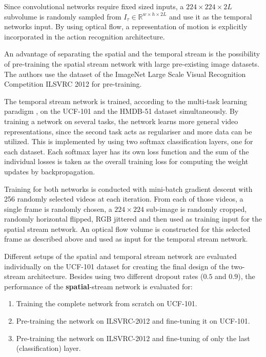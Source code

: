 Since convolutional networks require fixed sized inputs, a $224 \times 224 \times 2L$ subvolume is randomly sampled from $I_\tau \in \mathbb{R}^{w \times h \times 2L}$ and use it as the temporal networks input.
By using optical flow, a representation of motion is explicitly incorporated in the action recognition architecture.

An advantage of separating the spatial and the temporal stream is the possibility of pre-training the spatial stream network with large pre-existing image datasets.
The authors use the dataset of the ImageNet Large Scale Visual Recognition Competition ILSVRC 2012 \cite{russakovsky_imagenet_2015} for pre-training.

The temporal stream network is trained, according to the multi-task learning paradigm \cite{collobert_unified_2008}, on the UCF-101 and the HMDB-51 dataset simultaneously. 
By training a network on several tasks, the network learns more general video representations, since the second task acts as regulariser and more data can be utilized.
This is implemented by using two softmax classification layers, one for each dataset.
Each softmax layer has its own loss function and the sum of the individual losses is taken as the overall training loss for computing the weight updates by backpropagation.

Training for both networks is conducted with mini-batch gradient descent with 256 randomly selected videos at each iteration.
From each of those videos, a single frame is randomly chosen, a $224 \times 224$ sub-image is randomly cropped, randomly horizontal flipped, RGB jittered and then used as training input for the spatial stream network.
An optical flow volume is constructed for this selected frame as described above and used as input for the temporal stream network.



Different setups of the spatial and temporal stream network are evaluated individually on the UCF-101 dataset for creating the final design of the two-stream architecture.
Besides using two different dropout rates ($0.5$ and $0.9$), the performance of the \textbf{spatial}-stream network is evaluated for:
\begin{enumerate}
    \item Training the complete network from scratch on UCF-101.
    \item Pre-training the network on ILSVRC-2012 and fine-tuning it on UCF-101.
    \item Pre-training the network on ILSVRC-2012 and fine-tuning of only the last (classification) layer.
\end{enumerate}


